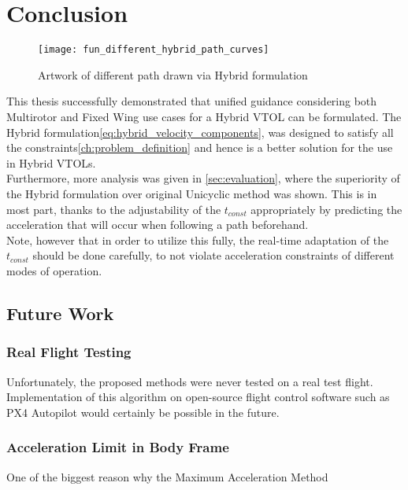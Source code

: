 \chapter{Conclusion}
\label{ch:conclusion}

\begin{figure}[h]
\centering
\texttt{[image: fun\_different\_hybrid\_path\_curves]}
\caption{Artwork of different path drawn via Hybrid formulation}
\end{figure}

This thesis successfully demonstrated that unified guidance considering both Multirotor and Fixed Wing use cases for a Hybrid VTOL can be formulated. The Hybrid formulation\ref{eq:hybrid_velocity_components}, was designed to satisfy all the constraints\ref{ch:problem_definition} and hence is a better solution for the use in Hybrid VTOLs.\\

Furthermore, more analysis was given in \autoref{sec:evaluation}, where the superiority of the Hybrid formulation over original Unicyclic method was shown. This is in most part, thanks to the adjustability of the $t_{const}$ appropriately by predicting the acceleration that will occur when following a path beforehand.\\

Note, however that in order to utilize this fully, the real-time adaptation of the $t_{const}$ should be done carefully, to not violate acceleration constraints of different modes of operation.

\section{Future Work}

\subsection{Real Flight Testing}
Unfortunately, the proposed methods were never tested on a real test flight. Implementation of this algorithm on open-source flight control software such as PX4 Autopilot\cite{noauthor_px4_2023} would certainly be possible in the future.

\subsection{Acceleration Limit in Body Frame}
One of the biggest reason why the Maximum Acceleration Method

